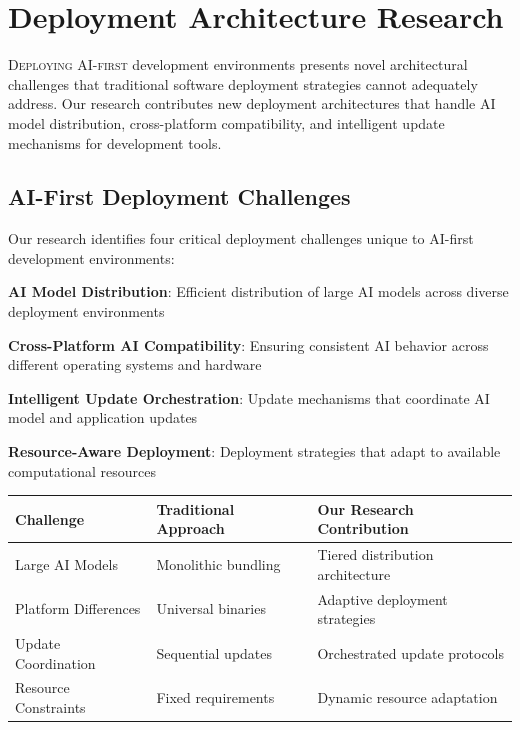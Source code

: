 
\section*{Deployment Architecture Research}

\lettrine{D}{eploying AI-first} development environments presents novel architectural challenges that traditional software deployment strategies cannot adequately address. Our research contributes new deployment architectures that handle AI model distribution, cross-platform compatibility, and intelligent update mechanisms for development tools.

\subsection*{AI-First Deployment Challenges}

Our research identifies four critical deployment challenges unique to AI-first development environments:

\begin{expandedlist}
    \item \textbf{AI Model Distribution}: Efficient distribution of large AI models across diverse deployment environments
    \item \textbf{Cross-Platform AI Compatibility}: Ensuring consistent AI behavior across different operating systems and hardware
    \item \textbf{Intelligent Update Orchestration}: Update mechanisms that coordinate AI model and application updates
    \item \textbf{Resource-Aware Deployment}: Deployment strategies that adapt to available computational resources
\end{expandedlist}

\begin{center}
\begin{tabular}{@{}lll@{}}
\toprule
\textbf{Challenge} & \textbf{Traditional Approach} & \textbf{Our Research Contribution} \\
\midrule
Large AI Models & Monolithic bundling & Tiered distribution architecture \\
Platform Differences & Universal binaries & Adaptive deployment strategies \\
Update Coordination & Sequential updates & Orchestrated update protocols \\
Resource Constraints & Fixed requirements & Dynamic resource adaptation \\
\bottomrule
\end{tabular}
\end{center}


